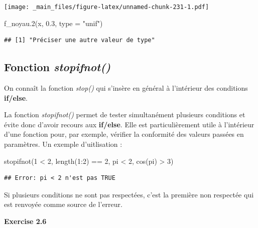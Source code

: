 \documentclass[
]{book}
\newenvironment{Shaded}{\begin{snugshade}}{\end{snugshade}}
\newcommand{\AttributeTok}[1]{\textcolor[rgb]{0.77,0.63,0.00}{#1}}
\newcommand{\DecValTok}[1]{\textcolor[rgb]{0.00,0.00,0.81}{#1}}
\newcommand{\FloatTok}[1]{\textcolor[rgb]{0.00,0.00,0.81}{#1}}
\newcommand{\FunctionTok}[1]{\textcolor[rgb]{0.00,0.00,0.00}{#1}}
\newcommand{\NormalTok}[1]{#1}
\newcommand{\SpecialCharTok}[1]{\textcolor[rgb]{0.00,0.00,0.00}{#1}}
\newcommand{\StringTok}[1]{\textcolor[rgb]{0.31,0.60,0.02}{#1}}
\theoremstyle{definition}
\theoremstyle{definition}
\theoremstyle{definition}
\theoremstyle{definition}
\theoremstyle{remark}
\begin{document}
\texttt{[image: \_main\_files/figure-latex/unnamed-chunk-231-1.pdf]}

\begin{Shaded}
\begin{Highlighting}[]
\FunctionTok{f\_noyau.2}\NormalTok{(x, }\FloatTok{0.3}\NormalTok{, }\AttributeTok{type =} \StringTok{"unif"}\NormalTok{)}
\end{Highlighting}
\end{Shaded}

\begin{verbatim}
## [1] "Préciser une autre valeur de type"
\end{verbatim}

\hypertarget{fonction-stopifnot}{%
\subsection{\texorpdfstring{Fonction \emph{stopifnot()}}{Fonction stopifnot()}}\label{fonction-stopifnot}}

On connaît la fonction \emph{stop()} qui s'insère en général à l'intérieur des conditions \textbf{if/else}.

La fonction \emph{stopifnot()} permet de tester simultanément plusieurs conditions et évite donc d'avoir recours aux \textbf{if/else}. Elle est particulièrement utile à l'intérieur d'une fonction pour, par exemple, vérifier la conformité des valeurs passées en paramètres. Un exemple d'uitlisation :

\begin{Shaded}
\begin{Highlighting}[]
\FunctionTok{stopifnot}\NormalTok{(}\DecValTok{1} \SpecialCharTok{\textless{}} \DecValTok{2}\NormalTok{, }\FunctionTok{length}\NormalTok{(}\DecValTok{1}\SpecialCharTok{:}\DecValTok{2}\NormalTok{) }\SpecialCharTok{==} \DecValTok{2}\NormalTok{, pi }\SpecialCharTok{\textless{}} \DecValTok{2}\NormalTok{, }\FunctionTok{cos}\NormalTok{(pi) }\SpecialCharTok{\textgreater{}} \DecValTok{3}\NormalTok{)}
\end{Highlighting}
\end{Shaded}

\begin{verbatim}
## Error: pi < 2 n'est pas TRUE
\end{verbatim}

Si plusieurs conditions ne sont pas respectées, c'est la première non respectée qui est renvoyée comme source de l'erreur.

\textbf{Exercise 2.6}
\end{document}
